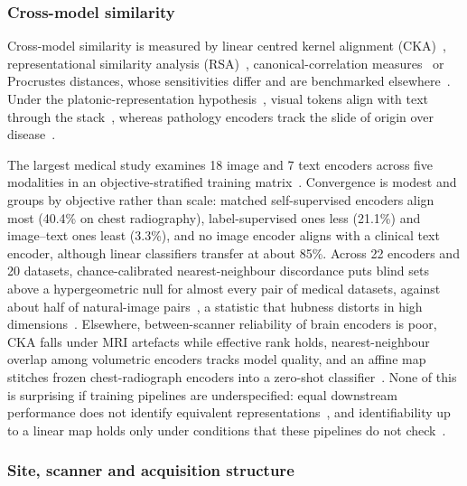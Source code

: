 \subsubsection{Cross-model similarity}

Cross-model similarity is measured by linear centred kernel alignment
(CKA)~\cite{kornblith2019similarity}, representational similarity analysis
(RSA)~\cite{kriegeskorte2008representational}, canonical-correlation
measures~\cite{raghu2017svcca,morcos2018insights} or Procrustes distances, whose sensitivities differ and
are benchmarked elsewhere~\cite{klabunde2023similarity,ding2021grounding}. Under the
platonic-representation hypothesis~\cite{huh2024platonic}, visual tokens align with text through the
stack~\cite{neo2024towards}, whereas pathology encoders track the slide of origin over
disease~\cite{mishra2025comparing}.

The largest medical study examines 18 image and 7 text encoders across five modalities in an
objective-stratified training matrix~\cite{tayebiarasteh2026self}. Convergence is modest and groups by
objective rather than scale: matched self-supervised encoders align most (40.4\% on chest radiography),
label-supervised ones less (21.1\%) and image--text ones least (3.3\%), and no image encoder aligns with a
clinical text encoder, although linear classifiers transfer at about 85\%. Across 22 encoders and 20
datasets, chance-calibrated nearest-neighbour discordance puts blind sets above a hypergeometric null for
almost every pair of medical datasets, against about half of natural-image
pairs~\cite{arasteh2026candor}, a statistic that hubness distorts in high
dimensions~\cite{radovanovic2010hubs}. Elsewhere, between-scanner reliability of brain encoders is
poor, CKA falls under MRI artefacts while effective rank holds, nearest-neighbour overlap among
volumetric encoders tracks model quality, and an affine map stitches frozen chest-radiograph encoders
into a zero-shot
classifier~\cite{navarrogonzalez2026crossscanner,mielcarz2026do,aerts2025foundation,folco2025semantic}.
None of this is surprising if training pipelines are underspecified: equal downstream performance does
not identify equivalent representations~\cite{damour2022underspecification}, and identifiability up to
a linear map holds only under conditions that these pipelines do not check~\cite{roeder2020linear}.

\subsubsection{Site, scanner and acquisition structure}

